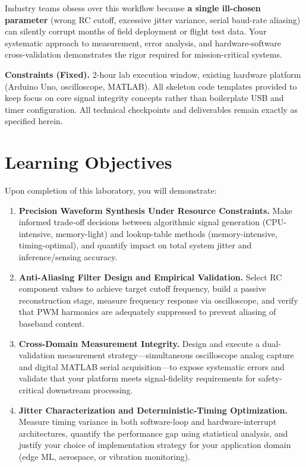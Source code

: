 \documentclass[11pt,letterpaper]{article}
\begin{document}
\noindent
Industry teams obsess over this workflow because \textbf{a single ill-chosen parameter} (wrong RC cutoff, excessive jitter variance, serial baud-rate aliasing) can silently corrupt months of field deployment or flight test data. Your systematic approach to measurement, error analysis, and hardware-software cross-validation demonstrates the rigor required for mission-critical systems.

\noindent
\textbf{Constraints (Fixed).} 2-hour lab execution window, existing hardware platform (Arduino Uno, oscilloscope, MATLAB). All skeleton code templates provided to keep focus on core signal integrity concepts rather than boilerplate USB and timer configuration. All technical checkpoints and deliverables remain exactly as specified herein.

\clearpage

\section{Learning Objectives}
Upon completion of this laboratory, you will demonstrate:

\begin{enumerate}
    \item \textbf{Precision Waveform Synthesis Under Resource Constraints.} Make informed trade-off decisions between algorithmic signal generation (CPU-intensive, memory-light) and lookup-table methods (memory-intensive, timing-optimal), and quantify impact on total system jitter and inference/sensing accuracy.

    \item \textbf{Anti-Aliasing Filter Design and Empirical Validation.} Select RC component values to achieve target cutoff frequency, build a passive reconstruction stage, measure frequency response via oscilloscope, and verify that PWM harmonics are adequately suppressed to prevent aliasing of baseband content.

    \item \textbf{Cross-Domain Measurement Integrity.} Design and execute a dual-validation measurement strategy---simultaneous oscilloscope analog capture and digital MATLAB serial acquisition---to expose systematic errors and validate that your platform meets signal-fidelity requirements for safety-critical downstream processing.

    \item \textbf{Jitter Characterization and Deterministic-Timing Optimization.} Measure timing variance in both software-loop and hardware-interrupt architectures, quantify the performance gap using statistical analysis, and justify your choice of implementation strategy for your application domain (edge ML, aerospace, or vibration monitoring).
\end{enumerate}
\end{document}
